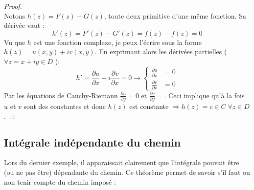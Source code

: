     \begin{proof}\ \\
    Notons $h(z) = F(z) - G(z)$, toute deux primitive d'une même fonction. Sa dérivée
    vaut :
    \begin{equation}
    h'(z) =  F'(z) - G'(z) = f(z) - f(z) = 0
    \end{equation}
    Vu que $h$ est une fonction complexe, je peux l'écrire sous la forme $h(z) = 
    u(x,y) + iv(x,y)$. En exprimant alors les dérivées partielles ($\forall z =
    x + iy \in D$ ):
    \begin{equation}
    h' = \frac{\partial u}{\partial x} + i\frac{\partial v}{\partial x} = 0 \rightarrow
    \left\{\begin{array}{ll}
    \frac{\partial u}{\partial x} &= 0  \\
    \frac{\partial v}{\partial x} &= 0 
    \end{array}\right.
    \end{equation}
    Par les équations de Cauchy-Riemann $\frac{\partial u}{\partial y} =0$ et 
    $\frac{\partial v}{\partial y} = $. Ceci implique qu'à la fois $u$ et $v$ sont
    des constantes et donc $h(z)$ est constante $\Rightarrow h(z) = c \in C \; \forall
    z \in D$.
    \end{proof}
    
    \subsection{Intégrale indépendante du chemin}
    Lors du dernier exemple, il apparaissait clairement que l'intégrale pouvait être
    (ou ne pas être) dépendante du chemin. Ce théorème permet de savoir s'il faut ou
    non tenir compte du chemin imposé :\\
    
    
